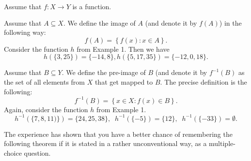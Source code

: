 \documentclass[11pt]{article}
\theoremstyle{definition}
\theoremstyle{plain}
\begin{document}
Assume that \( f:X\to Y \) is a function.

Assume that \( A\subseteq X \). We define the image of \( A \) (and denote it by \( f(A) \)) in the following way: \[ f(A)=\left\{ f(x): x\in A\right\}.\]
Consider the function \( h \) from Example 1. Then we have \[ h\left(\{3,25\}\right)=\{-14,8\}, h\left(\{5,17,35\}\right)=\{-12,0,18\}.\]

Assume that \( B\subseteq Y \). We define the pre-image of \( B \) (and denote it by \( f^{-1}(B) \) as the set of all elements from \( X \) that get mapped to \( B \). The precise definition is the following: \[ f^{-1}(B)=\left\{x\in X: f(x)\in B\right\}.\]
Again, consider the function \( h \) from Example 1. \[ h^{-1}\left(\{7,8,11)\}\right)=\{24,25,38\},\;\; h^{-1}\left(\{-5\}\right)=\{12\},\;\; h^{-1}\left(\{-33\}\right)=\emptyset.\]

The experience has shown that you have a better chance of remembering the following theorem if it is stated in a rather unconventional way, as a multiple-choice question.
\end{document}

